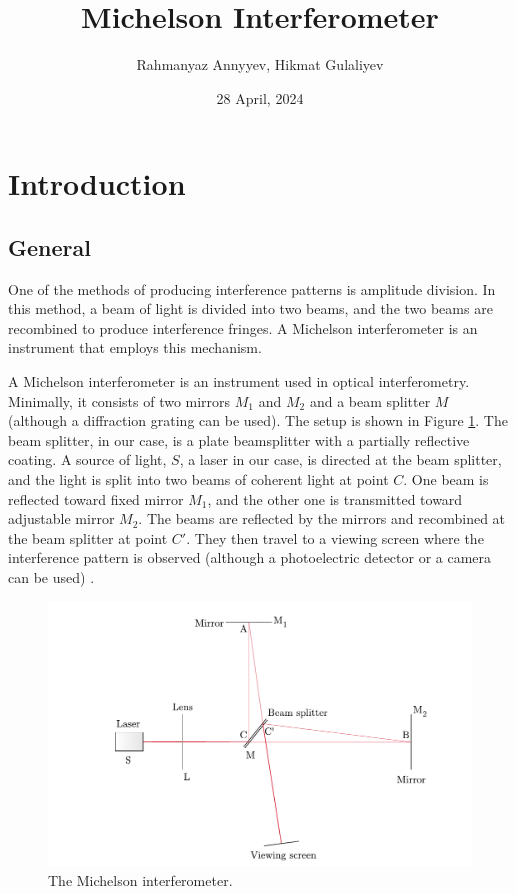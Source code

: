 \documentclass[10pt]{article}
\title{Michelson Interferometer}
\author{Rahmanyaz Annyyev, Hikmat Gulaliyev}
\date{28 April, 2024}
\newcommand{\td}[1]{\todo[linecolor=blue, backgroundcolor=blue!25,bordercolor=blue, size=\small, inline]{#1}}
\begin{document}
\maketitle

\begin{abstract}
  \td{Write the abstract.}
\end{abstract}

\section{Introduction}

\subsection*{General}

One of the methods of producing interference patterns is amplitude division. In this method, a beam of light is divided into two beams, and the two beams are recombined to produce interference fringes. A Michelson interferometer is an instrument that employs this mechanism.

A Michelson interferometer is an instrument used in optical interferometry. Minimally, it consists of two mirrors $M_1$ and $M_2$ and a beam splitter $M$ (although a diffraction grating can be used). The setup is shown in Figure \ref{fig:1}. The beam splitter, in our case, is a plate beamsplitter with a partially reflective coating. A source of light, $S$, a laser in our case, is directed at the beam splitter, and the light is split into two beams of coherent light at point $C$. One beam is reflected toward fixed mirror $M_1$, and the other one is transmitted toward adjustable mirror $M_2$. The beams are reflected by the mirrors and recombined at the beam splitter at point $C'$. They then travel to a viewing screen where the interference pattern is observed (although a photoelectric detector or a camera can be used) \cite{Hecht_2017}.

\begin{figure}[hbt!]
  \centering
  \includegraphics[scale=0.6]{figures/f1.pdf}
  \caption{The Michelson interferometer.}
  \label{fig:1}
\end{figure}
\end{document}

